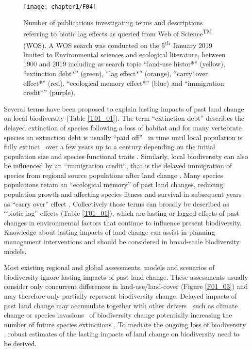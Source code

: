 \begin{figure}[htb]
\centering
\texttt{[image: chapter1/F04]}
\caption{ Number of publications investigating terms and descriptions referring to biotic lag effects as queried from Web of Science\textsuperscript{TM} (WOS). A WOS search was conducted on the 5\textsuperscript{th} January 2019 limited to Environmental sciences and ecological literature, between 1900 and 2019 including as search topic “land-use histor*” (yellow), “extinction debt*” (green), “lag effect*” (orange), “carry*over effect*” (red), “ecological memory effect*” (blue) and “immigration credit*” (purple).  }
\label{F01_04}
\end{figure}

Several terms have been proposed to explain lasting impacts of past land change on local biodiversity (Table \ref{T01_01}). The term “extinction debt” describes the delayed extinction of species following a loss of habitat \citep{Balmford1996,Kuussaari2009,Wearn2012} and for many vertebrate species an extinction debt is usually “paid off” \textendash\ \eg in time until local population is fully extinct \textendash\ over a few years up to a century depending on the initial population size and species functional traits \citep{Halley2016}. Similarly, local biodiversity can also be influenced by an “immigration credit“, that is the delayed immigration of species from regional source populations after land change \citep{Jackson2010,Hylander2013}. Many species populations retain an “ecological memory” \citep{Peterson2002,Bengtsson2003,Ogle2015} of past land changes, reducing population growth and affecting species fitness and survival in subsequent years as “carry over” effect \citep{Harrison2011}. Collectively those terms can broadly be described as “biotic lag” effects (Table \ref{T01_01}), which are lasting or lagged effects of past changes in environmental factors that continue to influence present biodiversity. Knowledge about lasting impacts of land change can assist in planning management interventions \citep{Standish2014} and should be considered in broad-scale biodiversity models.  

Most existing regional and global assessments, models and scenarios of biodiversity \citep[\eg \ those included in the Intergovernmental Science-Policy Platform on Biodiversity and Ecosystem Services (IPBES) assessments, ][]{Alkemade2009,Pereira2010,Newbold2015} ignore lasting impacts of past land change. These assessments usually consider only concurrent differences in land-use/land-cover (Figure \ref{F01_03}) and may therefore only partially represent biodiversity change. Delayed impacts of past land change may accumulate together with other drivers \textendash\ such as climate change or species invasions \textendash\ of biodiversity change \citep{Essl2015,Essl2015a} potentially increasing the number of future species extinctions \citep{Dullinger2013}. To mediate the ongoing loss of biodiversity \citep{Mace2018}, robust estimates of the lasting impacts of land change on biodiversity need to be derived.

